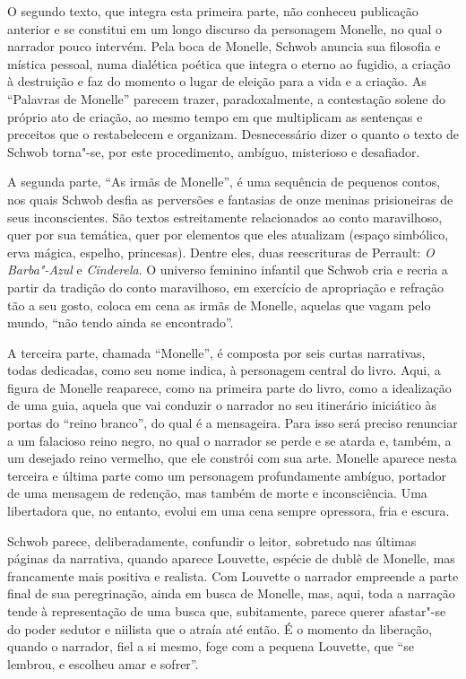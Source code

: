O segundo texto, que integra esta primeira parte, não conheceu publicação
anterior e se constitui em um longo discurso da personagem Monelle, no qual o
narrador pouco intervém. Pela boca de Monelle, Schwob anuncia sua filosofia e
mística pessoal, numa dialética poética que integra o eterno ao fugidio, a
criação à destruição e faz do momento o lugar de eleição para a vida e a
criação. As ``Palavras de Monelle'' parecem trazer, paradoxalmente, a
contestação solene do próprio ato de criação, ao mesmo tempo em que multiplicam
as sentenças e preceitos que o restabelecem e organizam. Desnecessário dizer o
quanto o texto de Schwob torna"-se, por este procedimento, ambíguo, misterioso e
desafiador.

A segunda parte, ``As irmãs de Monelle'', é uma sequência de pequenos
contos, nos quais Schwob desfia as perversões e fantasias de onze meninas
prisioneiras de seus inconscientes. São textos estreitamente relacionados ao
conto maravilhoso, quer por sua temática, quer por elementos que eles atualizam
(espaço simbólico, erva mágica, espelho, princesas). Dentre eles, duas
reescrituras de Perrault: \textit{O Barba"-Azul} e \textit{Cinderela}. O
universo feminino infantil que Schwob cria e recria a partir da tradição do
conto maravilhoso, em exercício de apropriação e refração tão a seu gosto,
coloca em cena as irmãs de Monelle, aquelas que vagam pelo mundo, “não tendo
ainda se encontrado”. 

A terceira parte, chamada ``Monelle'', é composta por seis curtas
narrativas, todas dedicadas, como seu nome indica, à personagem central do
livro. Aqui, a figura de Monelle reaparece, como na
primeira parte do livro, como a idealização de uma guia, aquela que vai conduzir
o narrador no seu itinerário iniciático às portas do “reino branco”, do qual é
a mensageira. Para isso será preciso renunciar a um falacioso reino negro, no
qual o narrador se perde e se atarda e, também, a um desejado reino vermelho,
que ele constrói com sua arte. Monelle aparece nesta terceira e última parte
como um personagem profundamente ambíguo, portador de uma mensagem de redenção,
mas também de morte e inconsciência. Uma libertadora que, no entanto, evolui em
uma cena sempre opressora, fria e escura.

Schwob parece, deliberadamente, confundir o leitor, sobretudo nas últimas
páginas da narrativa, quando aparece Louvette, espécie de dublê de Monelle, mas
francamente mais positiva e realista. Com Louvette o narrador empreende a parte
final de sua peregrinação, ainda em busca de Monelle, mas, aqui, toda a
narração tende à representação de uma busca que, subitamente, parece querer
afastar"-se do poder sedutor e niilista que o atraía até então. É o momento da
liberação, quando o narrador, fiel a si mesmo, foge com a pequena Louvette, que
“se lembrou, e escolheu amar e sofrer”.

